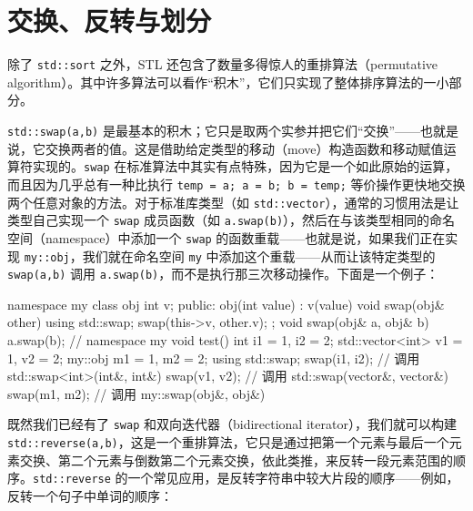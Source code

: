 \section{交换、反转与划分}

除了 \texttt{std::\allowbreak{}sort} 之外，STL 还包含了数量多得惊人的重排算法（permutative algorithm）。其中许多算法可以看作“积木”，它们只实现了整体排序算法的一小部分。

\texttt{std::\allowbreak{}swap(\allowbreak{}a,\allowbreak{}b)\allowbreak{}} 是最基本的积木；它只是取两个实参并把它们“交换”——也就是说，它交换两者的值。这是借助给定类型的移动（move）构造函数和移动赋值运算符实现的。\texttt{swap} 在标准算法中其实有点特殊，因为它是一个如此原始的运算，而且因为几乎总有一种比执行 \texttt{temp = a; a = b; b = temp;} 等价操作更快地交换两个任意对象的方法。对于标准库类型（如 \texttt{std::\allowbreak{}vector}），通常的习惯用法是让类型自己实现一个 \texttt{swap} 成员函数（如 \texttt{a.\allowbreak{}swap(\allowbreak{}b)\allowbreak{}}），然后在与该类型相同的命名空间（namespace）中添加一个 \texttt{swap} 的函数重载——也就是说，如果我们正在实现 \texttt{my::\allowbreak{}obj}，我们就在命名空间 \texttt{my} 中添加这个重载——从而让该特定类型的 \texttt{swap(\allowbreak{}a,\allowbreak{}b)\allowbreak{}} 调用 \texttt{a.\allowbreak{}swap(\allowbreak{}b)\allowbreak{}}，而不是执行那三次移动操作。下面是一个例子：

\begin{codebox}[cpp]
     namespace my {
       class obj {
         int v;
       public:
         obj(int value) : v(value) {}
         void swap(obj& other) {
           using std::swap;
           swap(this->v, other.v);
         }
       };
       void swap(obj& a, obj& b) {
         a.swap(b);
       }
     } // namespace my
     void test()
     {
       int i1 = 1, i2 = 2;
       std::vector<int> v1 = {1}, v2 = {2};
       my::obj m1 = 1, m2 = 2;
       using std::swap;
       swap(i1, i2); // 调用 std::swap<int>(int&, int&)
       swap(v1, v2); // 调用 std::swap(vector&, vector&)
       swap(m1, m2); // 调用 my::swap(obj&, obj&)
     }
\end{codebox}

既然我们已经有了 \texttt{swap} 和双向迭代器（bidirectional iterator），我们就可以构建 \texttt{std::\allowbreak{}reverse(\allowbreak{}a,\allowbreak{}b)\allowbreak{}}，这是一个重排算法，它只是通过把第一个元素与最后一个元素交换、第二个元素与倒数第二个元素交换，依此类推，来反转一段元素范围的顺序。\texttt{std::\allowbreak{}reverse} 的一个常见应用，是反转字符串中较大片段的顺序——例如，反转一个句子中单词的顺序：

